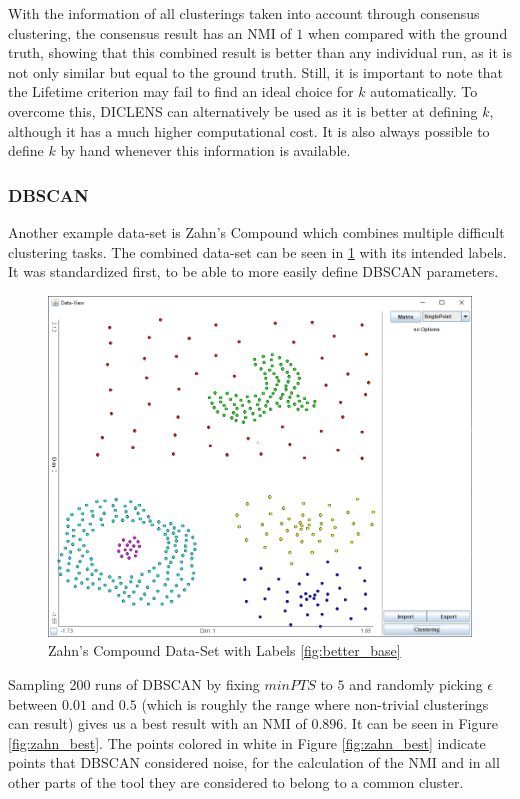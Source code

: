\documentclass[
	a4paper,
	english,
	twoside,
	openright,               
	11pt                            
	]{report}
\begin{document}
With the information of all clusterings taken into account through consensus clustering, the consensus result has an NMI of $1$ when compared with the ground truth, showing that this combined result is better than any individual run, as it is not only similar but equal to the ground truth. Still, it is important to note that the Lifetime criterion may fail to find an ideal choice for $k$ automatically. To overcome this, DICLENS can alternatively be used as it is better at defining $k$, although it has a much higher computational cost. It is also always possible to define $k$ by hand whenever this information is available.

\subsubsection{DBSCAN}
Another example data-set is Zahn's Compound \cite{1671676} which combines multiple difficult clustering tasks. The combined data-set can be seen in \ref{fig:zahn} with its intended labels. It was standardized first, to be able to more easily define DBSCAN parameters.

\begin{figure}[h]
	\centering
	\includegraphics[scale=.5]{zahn}
	\caption{Zahn's Compound Data-Set with Labels \ref{fig:better_base}}
	\label{fig:zahn}
\end{figure}

Sampling 200 runs of DBSCAN by fixing $minPTS$ to $5$ and randomly picking $\epsilon$ between $0.01$ and $0.5$ (which is roughly the range where non-trivial clusterings can result) gives us a best result with an NMI of $0.896$. It can be seen in Figure \ref{fig:zahn_best}. The points colored in white in Figure \ref{fig:zahn_best} indicate points that DBSCAN considered noise, for the calculation of the NMI and in all other parts of the tool they are considered to belong to a common cluster.
\end{document}
